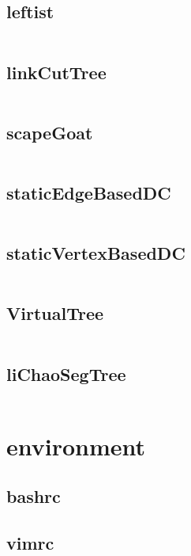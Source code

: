   \subsection{leftist}
    \inputminted{cpp}{../code/data_structure/leftist.cpp}
  \subsection{linkCutTree}
    \inputminted{cpp}{../code/data_structure/linkCutTree.cpp}
  \subsection{scapeGoat}
    \inputminted{cpp}{../code/data_structure/scapeGoat.cpp}
  \subsection{staticEdgeBasedDC}
    \inputminted{cpp}{../code/data_structure/staticEdgeBasedDC.cpp}
  \subsection{staticVertexBasedDC}
    \inputminted{cpp}{../code/data_structure/staticVertexBasedDC.cpp}
  \subsection{VirtualTree}
    \inputminted{cpp}{../code/data_structure/VirtualTree.cpp}
  \subsection{liChaoSegTree}
    \inputminted{cpp}{../code/data_structure/liChaoSegTree.cpp}
\section{environment}
  \subsection{bashrc}
    
  \subsection{vimrc}
    